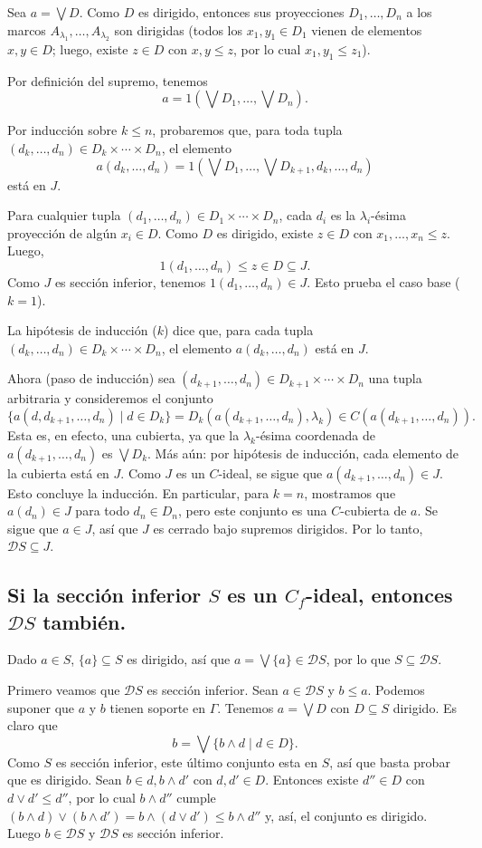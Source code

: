 \documentclass[12pt,letterpaper,titlepage]{article}
\theoremstyle{definition}
\renewcommand\sup{\vee}
\newcommand\Sup{\bigvee}
\renewcommand\inf{\wedge}
\newcommand\D{\mathcal D}
\newcommand\tps[1]{\texorpdfstring{#1}{}}
\newcommand\<{\langle}
\renewcommand\>{\rangle}
\begin{document}
Sea $a=\Sup D$.
Como $D$ es dirigido, entonces sus proyecciones $D_1,\dots,D_n$ a
los marcos $A_{\lambda_1},\dots,A_{\lambda_2}$ son dirigidas
(todos los $x_1,y_1\in D_1$ vienen de elementos $x,y\in D$;
luego, existe $z\in D$ con $x,y\leq z$, por lo cual $x_1,y_1\leq
z_1$).

Por definición del supremo, tenemos
\[
  a = 1(\Sup D_1,\dots,\Sup D_n)
.\]

Por inducción sobre $k\leq n$, probaremos que, para toda tupla
$(d_k,\dots,d_n)\in D_k\times\cdots\times D_n$, el elemento
\[
  a(d_k,\dots,d_n)
  =
  1(\Sup D_1,\dots,\Sup D_{k+1},d_k,\dots,d_n)
\]
está en $J$.

Para cualquier tupla $(d_1,\dots,d_n)\in D_1\times\cdots\times
D_n$, cada $d_i$ es la $\lambda_i$-ésima
proyección de algún $x_i\in D$.
Como $D$ es dirigido, existe $z\in D$ con $x_1,\dots,x_n\leq z$.
Luego,
\[
  1(d_1,\dots,d_n)\leq z\in D \subseteq J
.\]
Como $J$ es sección inferior, tenemos $1(d_1,\dots,d_n)\in J$.
Esto prueba el caso base ($k=1$).

La hipótesis de inducción ($k$) dice que, para cada tupla
$(d_k,\dots,d_n)\in D_k\times\cdots\times D_n$, el elemento
$a(d_k,\dots,d_n)$ está en $J$.

Ahora (paso de inducción) sea
$(d_{k+1},\dots,d_n)\in D_{k+1}\times\cdots\times D_n$ una tupla
arbitraria y consideremos el conjunto
\
\[
  \{a(d,d_{k+1},\dots,d_n) \mid d\in D_k\}
  =
  D_k(a(d_{k+1},\dots,d_n),\lambda_k)
  \in
  C(a(d_{k+1},\dots,d_n))
.\]
Esta es, en efecto, una cubierta, ya que la $\lambda_k$-ésima
coordenada de $a(d_{k+1},\dots,d_n)$ es $\Sup D_k$.
Más aún: por hipótesis de inducción, cada elemento de la cubierta
está en $J$.
Como $J$ es un $C$-ideal, se sigue que
$a(d_{k+1},\dots,d_n)\in J$.
Esto concluye la inducción.
En particular, para $k=n$, mostramos que $a(d_n)\in J$ para todo
$d_n\in D_n$, pero este conjunto es una $C$-cubierta de $a$.
Se sigue que $a\in J$, así que $J$ es cerrado bajo supremos
dirigidos.
Por lo tanto, $\D S\subseteq J$.

\subsection{Si la sección inferior \tps{$S$} es un \tps{$C_f$}-ideal,
entonces \tps{$\D S$} también.}

Dado $a\in S$, $\{a\}\subseteq S$ es dirigido, así que
$a=\Sup\{a\}\in \D S$, por lo que $S\subseteq\D S$.

Primero veamos que $\D S$ es sección inferior.
Sean $a\in \D S$ y $b\leq a$.
Podemos suponer que $a$ y $b$ tienen soporte en $\Gamma$.
Tenemos $a=\Sup D$ con $D\subseteq S$ dirigido.
Es claro que
\[
  b = \Sup\{b\inf d\mid d\in D\}
.\]
Como $S$ es sección inferior, este último conjunto esta en $S$,
así que basta probar que es dirigido.
Sean $b\in d,b\inf d'$ con $d,d'\in D$.
Entonces existe $d''\in D$ con $d\sup d'\leq d''$, por lo
cual $b\inf d''$ cumple
$(b\inf d)\sup(b\inf d')=b\inf(d\sup d')\leq b\inf d''$ y, así,
el conjunto es dirigido.
Luego $b\in\D S$ y $\D S$ es sección inferior.
\end{document}
